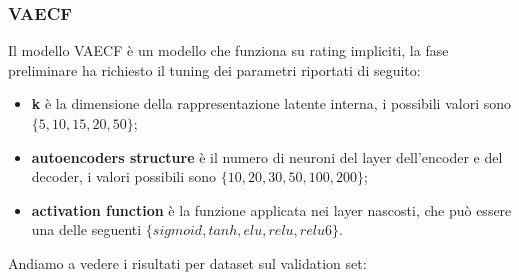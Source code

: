 
\subsubsection{VAECF}
Il modello VAECF è un modello che funziona su rating impliciti, la fase preliminare ha richiesto il tuning dei parametri riportati di seguito:
\begin{itemize}
    \item \textbf{k} è la dimensione della rappresentazione latente interna, i possibili valori sono $\{5,10,15,20,50\}$;
    \item \textbf{autoencoders structure} è il numero di neuroni del layer dell'encoder e del decoder, i valori possibili sono $\{10,20,30,50,100,200\}$;
    \item \textbf{activation function} è la funzione applicata nei layer nascosti, che può essere una delle seguenti $\{sigmoid, tanh, elu, relu, relu6\}$.
\end{itemize}

Andiamo a vedere i risultati per dataset sul validation set:\\

\\

